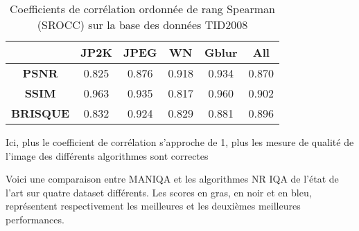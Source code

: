 \documentclass{ieeeaccess}
\begin{document}
\begin{table}[h]
\caption{Coefficients de corrélation ordonnée de rang Spearman (SROCC) sur la base des données TID2008}
\label{table}
\setlength{\tabcolsep}{9pt}
\begin{tabular}{|c|c|c|c|c|c|}
    \hline
    \textbf{ } & \textbf{JP2K} & \textbf{JPEG} & \textbf{WN} & \textbf{Gblur} & \textbf{All} \\
    \hline
    \textbf{PSNR} & 0.825 & 0.876 & 0.918 & 0.934 & 0.870 \\
    \textbf{SSIM} & 0.963 & 0.935 & 0.817 & 0.960 & 0.902 \\
    \textbf{BRISQUE} & 0.832 & 0.924 & 0.829 & 0.881 & 0.896 \\
    \hline
\end{tabular}
\end{table}

Ici, plus le coefficient de corrélation s’approche de 1, plus les mesure de qualité de l’image des différents algorithmes sont correctes 

 Voici une comparaison entre MANIQA et les algorithmes NR IQA de l’état de l’art sur quatre dataset différents. Les scores en gras, en noir et en bleu, représentent respectivement les meilleures et les deuxièmes meilleures performances.
\end{document}
